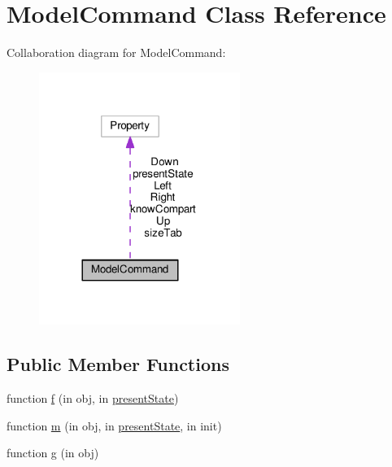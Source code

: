 \hypertarget{class_model_command}{}\section{Model\+Command Class Reference}
\label{class_model_command}


Collaboration diagram for Model\+Command\+:\nopagebreak
\begin{figure}[H]
\begin{center}
\leavevmode
\includegraphics[width=185pt]{class_model_command__coll__graph}
\end{center}
\end{figure}
\subsection*{Public Member Functions}
\begin{DoxyCompactItemize}
\item 
function \hyperlink{class_model_command_ad9bed4bf30a168ad0154e2a4bc93f580}{f} (in obj, in \hyperlink{class_model_command_a9624cc7c421a50fa5086b0ebd0cd5fe3}{present\+State})
\item 
function \hyperlink{class_model_command_accd2878e039165d11e1c6ff627011a8f}{m} (in obj, in \hyperlink{class_model_command_a9624cc7c421a50fa5086b0ebd0cd5fe3}{present\+State}, in init)
\item 
function \hyperlink{class_model_command_a07dadfabe92bf9a144b8a862720e7746}{g} (in obj)
\end{DoxyCompactItemize}
